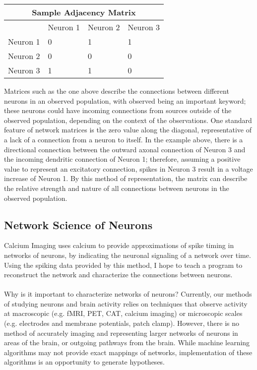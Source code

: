 \documentclass{article}
\begin{document}
\begin{center}
\begin{tabular}{ |p{3cm}|p{3cm}|p{3cm}|p{3cm}|  }
 \hline
 \multicolumn{4}{|c|}{Sample Adjacency Matrix} \\
 \hline
  & Neuron 1 & Neuron 2 & Neuron 3\\
 \hline
 Neuron 1 & 0 & 1 & 1\\
 Neuron 2 & 0 & 0 & 0\\
 Neuron 3 & 1 & 1 & 0\\
 \hline
\end{tabular}
\end{center}

Matrices such as the one above describe the connections between different neurons in an observed population, with observed being an important keyword; these neurons could have incoming connections from sources outside of the observed population, depending on the context of the observations. One standard feature of network matrices is the zero value along the diagonal, representative of a lack of a connection from a neuron to itself. In the example above, there is a directional connection between the outward axonal connection of Neuron 3 and the incoming dendritic connection of Neuron 1; therefore, assuming a positive value to represent an excitatory connection, spikes in Neuron 3 result in a voltage increase of Neuron 1. By this method of representation, the matrix can describe the relative strength and nature of all connections between neurons in the observed population.\par

\subsection{Network Science of Neurons}

Calcium Imaging uses calcium to provide approximations of spike timing in networks of neurons, by indicating the neuronal signaling of a network over time. Using the spiking data provided by this method, I hope to teach a program to reconstruct the network and characterize the connections between neurons.\\
\\
Why is it important to characterize networks of neurons? Currently, our methods of studying neurons and brain activity relies on techniques that observe activity at macroscopic (e.g. fMRI, PET, CAT, calcium imaging) or microscopic scales (e.g. electrodes and membrane potentials, patch clamp). However, there is no method of accurately imaging and representing larger networks of neurons in areas of the brain, or outgoing pathways from the brain. While machine learning algorithms may not provide exact mappings of networks, implementation of these algorithms is an opportunity to generate hypotheses.\par
\end{document}
